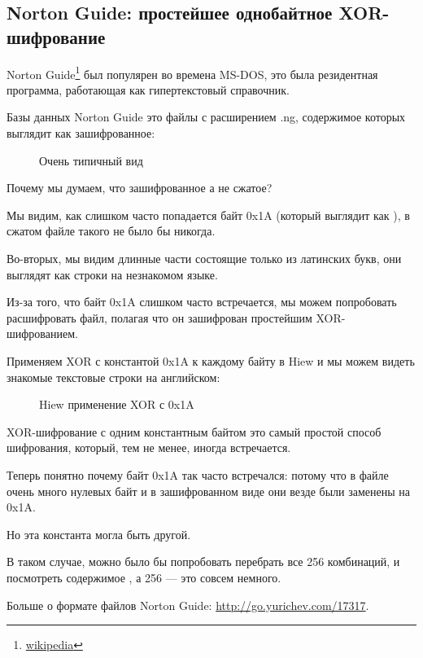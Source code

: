 \clearpage
\subsection{Norton Guide: простейшее однобайтное XOR-шифрование}
\label{norton_guide}

Norton Guide\footnote{\href{http://go.yurichev.com/17116}{wikipedia}} был популярен во времена MS-DOS, это была резидентная программа, работающая как
гипертекстовый справочник.

Базы данных Norton Guide это файлы с расширением .ng, содержимое которых выглядит как зашифрованное:

\begin{figure}[H]
\centering
{}
\caption{Очень типичный вид}
\end{figure}

Почему мы думаем, что зашифрованное а не сжатое? 

Мы видим, как слишком часто попадается байт 0x1A (который выглядит как \q{$\rightarrow$}), в сжатом файле такого не было бы никогда.

Во-вторых, мы видим длинные части состоящие только из латинских букв, они выглядят как строки
на незнакомом языке.

\clearpage

Из-за того, что байт 0x1A слишком часто встречается, мы можем попробовать расшифровать файл, полагая
что он зашифрован простейшим XOR-шифрованием.

Применяем XOR с константой 0x1A к каждому байту в Hiew и мы можем видеть знакомые текстовые строки на английском:

\begin{figure}[H]
\centering
{}
\caption{Hiew применение XOR с 0x1A}
\end{figure}

XOR-шифрование с одним константным байтом это самый простой способ шифрования, который, тем не менее, иногда
встречается.

Теперь понятно почему байт 0x1A так часто встречался: потому что в файле очень много нулевых байт 
и в зашифрованном виде они везде были заменены на 0x1A.

Но эта константа могла быть другой.

В таком случае, можно было бы попробовать перебрать все 256 комбинаций, и посмотреть содержимое , 
а 256 --- это совсем немного.

Больше о формате файлов Norton Guide: \url{http://go.yurichev.com/17317}.

